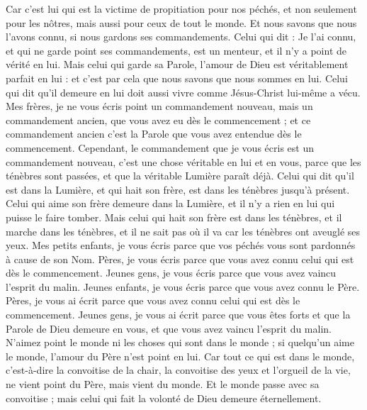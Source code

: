 \begin{multicols}{2}
Car c'est lui qui est la victime de propitiation pour nos péchés, et non seulement pour les nôtres, mais aussi pour ceux de tout le monde.
Et nous savons que nous l'avons connu, si nous gardons ses commandements.
Celui qui dit : Je l'ai connu, et qui ne garde point ses commandements, est un menteur, et il n'y a point de vérité en lui.
Mais celui qui garde sa Parole, l'amour de Dieu est véritablement parfait en lui : et c'est par cela que nous savons que nous sommes en lui.
Celui qui dit qu'il demeure en lui doit aussi vivre comme Jésus-Christ lui-même a vécu.
Mes frères, je ne vous écris point un commandement nouveau, mais un commandement ancien, que vous avez eu dès le commencement ; et ce commandement ancien c'est la Parole que vous avez entendue dès le commencement.
Cependant, le commandement que je vous écris est un commandement nouveau, c'est une chose véritable en lui et en vous, parce que les ténèbres sont passées, et que la véritable Lumière paraît déjà.
Celui qui dit qu'il est dans la Lumière, et qui hait son frère, est dans les ténèbres jusqu'à présent.
Celui qui aime son frère demeure dans la Lumière, et il n'y a rien en lui qui puisse le faire tomber.
Mais celui qui hait son frère est dans les ténèbres, et il marche dans les ténèbres, et il ne sait pas où il va car les ténèbres ont aveuglé ses yeux.
Mes petits enfants, je vous écris parce que vos péchés vous sont pardonnés à cause de son Nom.
Pères, je vous écris parce que vous avez connu celui qui est dès le commencement. Jeunes gens, je vous écris parce que vous avez vaincu l'esprit du malin.
Jeunes enfants, je vous écris parce que vous avez connu le Père. Pères, je vous ai écrit parce que vous avez connu celui qui est dès le commencement. Jeunes gens, je vous ai écrit parce que vous êtes forts et que la Parole de Dieu demeure en vous, et que vous avez vaincu l'esprit du malin.
N'aimez point le monde ni les choses qui sont dans le monde ; si quelqu'un aime le monde, l'amour du Père n'est point en lui.
Car tout ce qui est dans le monde, c'est-à-dire la convoitise de la chair, la convoitise des yeux et l'orgueil de la vie, ne vient point du Père, mais vient du monde.
Et le monde passe avec sa convoitise ; mais celui qui fait la volonté de Dieu demeure éternellement.

\end{multicols}
